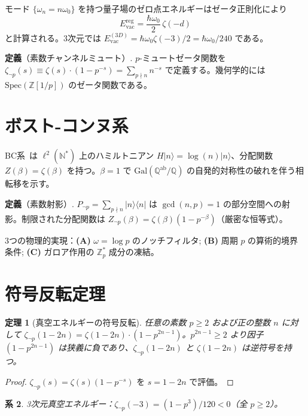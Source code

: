 \documentclass[11pt,a4paper]{article}
\newtheorem{theorem}{定理}
\newtheorem{corollary}[theorem]{系}
\newcommand{\Spec}{\mathrm{Spec}}
\newcommand{\Gal}{\mathrm{Gal}}
\newcommand{\Zp}{\mathbb{Z}[1/p]}
\begin{document}
モード $\{\omega_n = n\omega_0\}$ を持つ量子場のゼロ点エネルギーはゼータ正則化により
\begin{equation}
  E_{\mathrm{vac}}^{\mathrm{reg}} = \frac{\hbar\omega_0}{2}\,\zeta(-d)
\end{equation}
と計算される。3次元では $E_{\mathrm{vac}}^{(3D)} = \hbar\omega_0\zeta(-3)/2 = \hbar\omega_0/240$ である。

\noindent\textbf{定義}（素数チャンネルミュート）. $p$-ミュートゼータ関数を $\zeta_{\neg p}(s) \equiv \zeta(s)\cdot(1-p^{-s}) = \sum_{p\nmid n} n^{-s}$ で定義する。幾何学的には $\Spec(\Zp)$ のゼータ関数である。

\section{ボスト-コンヌ系}

BC系~\cite{BostConnes1995,ConnesMarcolli2006}は $\ell^2(\mathbb{N}^*)$ 上のハミルトニアン $H|n\rangle = \log(n)|n\rangle$、分配関数 $Z(\beta) = \zeta(\beta)$ を持つ。$\beta = 1$ で $\Gal(\mathbb{Q}^{\mathrm{ab}}/\mathbb{Q})$ の自発的対称性の破れを伴う相転移を示す。

\noindent\textbf{定義}（素数射影）. $P_{\neg p} = \sum_{p\nmid n} |n\rangle\langle n|$ は $\gcd(n,p)=1$ の部分空間への射影。制限された分配関数は $Z_{\neg p}(\beta) = \zeta(\beta)(1-p^{-\beta})$（厳密な恒等式）。

3つの物理的実現：\textbf{(A)} $\omega = \log p$ のノッチフィルタ; \textbf{(B)} 周期 $p$ の算術的境界条件; \textbf{(C)} ガロア作用の $\mathbb{Z}_p^*$ 成分の凍結。

\section{符号反転定理}

\begin{theorem}[真空エネルギーの符号反転]
\label{thm:sign_flip}
任意の素数 $p \geq 2$ および正の整数 $n$ に対して $\zeta_{\neg p}(1-2n) = \zeta(1-2n)\cdot(1-p^{2n-1})$。$p^{2n-1} \geq 2$ より因子 $(1-p^{2n-1})$ は狭義に負であり、$\zeta_{\neg p}(1-2n)$ と $\zeta(1-2n)$ は逆符号を持つ。
\end{theorem}
\begin{proof}
$\zeta_{\neg p}(s) = \zeta(s)(1-p^{-s})$ を $s = 1-2n$ で評価。
\end{proof}

\begin{corollary}
3次元真空エネルギー：$\zeta_{\neg p}(-3) = (1-p^3)/120 < 0$（全 $p \geq 2$）。
\end{corollary}
\end{document}
